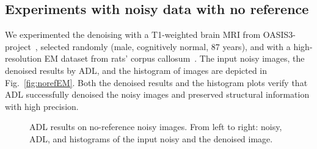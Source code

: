 \documentclass[journal,twoside,web]{ieeecolor}
\begin{document}
\subsection{Experiments with noisy data with no reference}
We experimented the denoising with a T1-weighted brain MRI from OASIS3-project~\cite{Oasis3}, selected randomly (male, cognitively normal, 87 years), and with a high-resolution EM dataset from rats' corpus callosum~\cite{abdollahzadeh2021deepacson}. 
The input noisy images, the denoised results by ADL, and the histogram of images are depicted in Fig.~\ref{fig:norefEM}. Both the denoised results and the histogram plots verify that ADL successfully denoised the noisy images and preserved structural information with high precision.

\begin{figure*}
    \centering
\caption{ADL results on no-reference noisy images. From left to right: noisy, ADL, and histograms of the input noisy and the denoised image.
}
\label{fig:noref}
\end{figure*}
\end{document}
